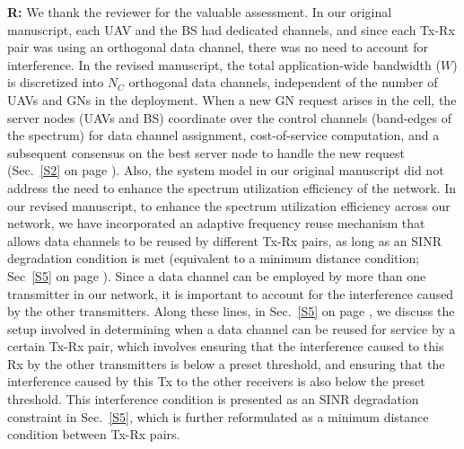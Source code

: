 \documentclass[12pt, draftcls, onecolumn]{IEEEtran}
\theoremstyle{plain}
\theoremstyle{definition}
\theoremstyle{remark}
\begin{document}
\begin{enumerate}
    \textbf{R:}
    We thank the reviewer for the valuable assessment. In our original manuscript, each UAV and the BS had dedicated channels, and since each Tx-Rx pair was using an orthogonal data channel, there was no need to account for interference. In the revised manuscript, the total application-wide bandwidth ($W$) is discretized into $N_{C}$ orthogonal data channels, independent of the number of UAVs and GNs in the deployment. When a new GN request arises in the cell, the server nodes (UAVs and BS) coordinate over the control channels (band-edges of the spectrum) for data channel assignment, cost-of-service computation, and a subsequent consensus on the best server node to handle the new request (Sec.~\ref{S2} on page \pageref{comm_model_label}). Also, the system model in our original manuscript did not address the need to enhance the spectrum utilization efficiency of the network. In our revised manuscript, to enhance the spectrum utilization efficiency across our network, we have incorporated an adaptive frequency reuse mechanism that allows data channels to be reused by different Tx-Rx pairs, as long as an SINR degradation condition is met (equivalent to a minimum distance condition; Sec~\ref{S5} on page \pageref{freq_reuse_label}). Since a data channel can be employed by more than one transmitter in our network, it is important to account for the interference caused by the other transmitters. Along these lines, in Sec.~\ref{S5} on page \pageref{freq_reuse_label}, we discuss the setup involved in determining when a data channel can be reused for service by a certain Tx-Rx pair, which involves ensuring that the interference caused to this Rx by the other transmitters is below a preset threshold, and ensuring that the interference caused by this Tx to the other receivers is also below the preset threshold. This interference condition is presented as an SINR degradation constraint in Sec.~\ref{S5}, which is further reformulated as a minimum distance condition between Tx-Rx pairs.
    \vspace{2mm}


\end{enumerate}
\end{document}
